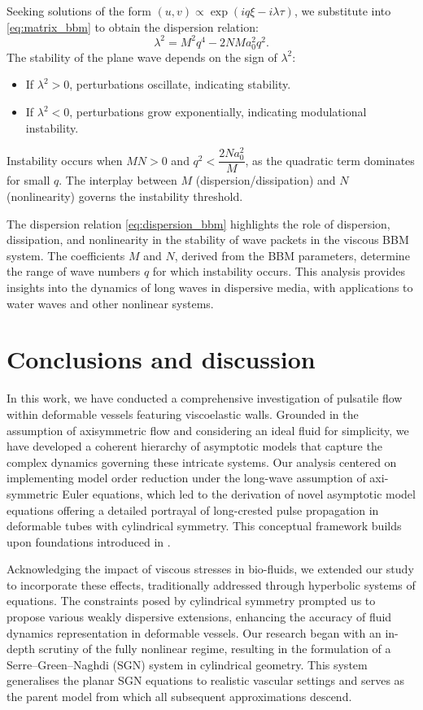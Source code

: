 \documentclass[alpha-refs, 12pt]{wiley-article}
\begin{document}
Seeking solutions of the form $(u, v) \propto \exp(i q \xi - i \lambda \tau)$, we substitute into \eqref{eq:matrix_bbm} to obtain the dispersion relation:
\begin{equation}\label{eq:dispersion_bbm}
  \lambda^2 = M^2 q^4 - 2 N M a_0^2 q^2.
\end{equation}
The stability of the plane wave depends on the sign of $\lambda^2$:
\begin{itemize}
  \item If $\lambda^2 > 0$, perturbations oscillate, indicating stability.
  \item If $\lambda^2 < 0$, perturbations grow exponentially, indicating modulational instability.
\end{itemize}
Instability occurs when $M N > 0$ and $q^2 < \dfrac{2 N a_0^2}{M}$, as the quadratic term dominates for small $q$. The interplay between $M$ (dispersion/dissipation) and $N$ (nonlinearity) governs the instability threshold.

The dispersion relation \eqref{eq:dispersion_bbm} highlights the role of dispersion, dissipation, and nonlinearity in the stability of wave packets in the viscous BBM system. The coefficients $M$ and $N$, derived from the BBM parameters, determine the range of wave numbers $q$ for which instability occurs. This analysis provides insights into the dynamics of long waves in dispersive media, with applications to water waves and other nonlinear systems.

\section{Conclusions and discussion}

In this work, we have conducted a comprehensive investigation of pulsatile flow within deformable vessels featuring viscoelastic walls. Grounded in the assumption of axisymmetric flow and considering an ideal fluid for simplicity, we have developed a coherent hierarchy of asymptotic models that capture the complex dynamics governing these intricate systems. Our analysis centered on implementing model order reduction under the long-wave assumption of axi-symmetric Euler equations, which led to the derivation of novel asymptotic model equations offering a detailed portrayal of long-crested pulse propagation in deformable tubes with cylindrical symmetry. This conceptual framework builds upon foundations introduced in \cite{Mitsotakis2018}.

Acknowledging the impact of viscous stresses in bio-fluids, we extended our study to incorporate these effects, traditionally addressed through hyperbolic systems of equations. The constraints posed by cylindrical symmetry prompted us to propose various weakly dispersive extensions, enhancing the accuracy of fluid dynamics representation in deformable vessels. Our research began with an in-depth scrutiny of the fully nonlinear regime, resulting in the formulation of a Serre--Green--Naghdi (SGN) system in cylindrical geometry. This system generalises the planar SGN equations to realistic vascular settings and serves as the parent model from which all subsequent approximations descend.
\end{document}
